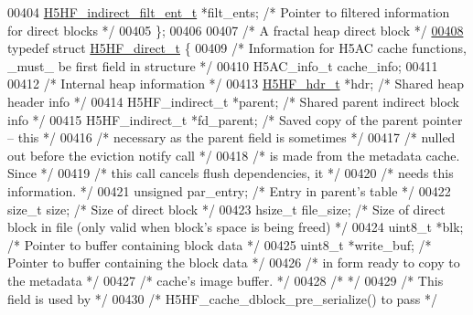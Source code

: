 \begin{DoxyCode}
00404     \hyperlink{struct_h5_h_f__indirect__filt__ent__t}{H5HF\_indirect\_filt\_ent\_t} *filt\_ents;    \textcolor{comment}{/* Pointer to filtered information for
       direct blocks */}
00405 \};
00406 
00407 \textcolor{comment}{/* A fractal heap direct block */}
\hyperlink{struct_h5_h_f__direct__t}{00408} \textcolor{keyword}{typedef} \textcolor{keyword}{struct }\hyperlink{struct_h5_h_f__direct__t}{H5HF\_direct\_t} \{
00409     \textcolor{comment}{/* Information for H5AC cache functions, \_must\_ be first field in structure */}
00410     H5AC\_info\_t cache\_info;
00411 
00412     \textcolor{comment}{/* Internal heap information */}
00413     \hyperlink{struct_h5_h_f__hdr__t}{H5HF\_hdr\_t}    *hdr;           \textcolor{comment}{/* Shared heap header info                */}
00414     H5HF\_indirect\_t *parent;    \textcolor{comment}{/* Shared parent indirect block info          */}
00415     H5HF\_indirect\_t *fd\_parent; \textcolor{comment}{/* Saved copy of the parent pointer -- this   */}
00416                 \textcolor{comment}{/* necessary as the parent field is sometimes */}
00417                 \textcolor{comment}{/* nulled out before the eviction notify call */}
00418                 \textcolor{comment}{/* is made from the metadata cache.  Since    */}
00419                 \textcolor{comment}{/* this call cancels flush dependencies, it   */}
00420                 \textcolor{comment}{/* needs this information.            */}
00421     \textcolor{keywordtype}{unsigned}    par\_entry;      \textcolor{comment}{/* Entry in parent's table                    */}
00422     \textcolor{keywordtype}{size\_t}      size;           \textcolor{comment}{/* Size of direct block                       */}
00423     hsize\_t     file\_size;      \textcolor{comment}{/* Size of direct block in file (only valid when block's space is being
       freed) */}
00424     uint8\_t     *blk;           \textcolor{comment}{/* Pointer to buffer containing block data    */}
00425     uint8\_t *write\_buf; \textcolor{comment}{/* Pointer to buffer containing the block data */}
00426                                 \textcolor{comment}{/* in form ready to copy to the metadata       */}
00427                                 \textcolor{comment}{/* cache's image buffer.                       */}
00428                                 \textcolor{comment}{/*                                             */}
00429                                 \textcolor{comment}{/* This field is used by                       */}
00430                                 \textcolor{comment}{/* H5HF\_cache\_dblock\_pre\_serialize() to pass   */}

\end{DoxyCode}
